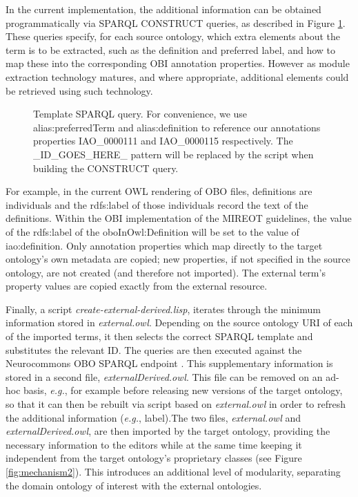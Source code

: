 \documentclass{ao2e}%
\begin{document}
In the current implementation, the additional information can be obtained programmatically via SPARQL \cite{SPARQL} CONSTRUCT queries, as described in Figure \ref{fig:sparql}.
These queries \cite{OBIQueries} specify, for each source ontology, which extra elements about the term is to be extracted, such as the definition and preferred label, and how to map these into the corresponding OBI annotation properties. However as module extraction technology matures, and where appropriate, additional elements could be retrieved using such technology.

\begin{figure}[t]
\scriptsize
 
\caption{Template SPARQL query. For convenience, we use alias:preferredTerm and
alias:definition to reference our annotations properties IAO\_0000111 and IAO\_0000115 \cite{IAO} respectively. The \_ID\_GOES\_HERE\_ pattern will be replaced by the script when building the CONSTRUCT query.}
\label{fig:sparql}
\end{figure}

For example, in the current \ac{OWL} rendering of \ac{OBO} files, definitions are individuals and the rdfs:label of those individuals record the text of the definitions. 
Within the \ac{OBI} implementation of the \ac{MIREOT} guidelines, the value of the rdfs:label of the oboInOwl:Definition will be set to the value of iao:definition. Only annotation properties which map directly to the target ontology's own metadata are copied; new properties, if not specified in the source ontology, are not created (and therefore not imported). The external term's property values are copied exactly from the external resource.

Finally, a script \emph{create-external-derived.lisp}, iterates through the minimum information stored in \emph{external.owl}.
Depending on the source ontology URI of each of the imported terms, it then selects the correct SPARQL template and substitutes the relevant ID.
The queries are then executed against the Neurocommons OBO SPARQL endpoint \cite{NeurocommonsSparql,Neurocommons}. This supplementary information is stored in a second file, \emph{externalDerived.owl}.
This file can be removed on an ad-hoc basis, \emph{e.g.}, for example before releasing new versions of the target ontology, so that it can then be rebuilt via script based on \emph{external.owl} in order to refresh the additional information (\emph{e.g.}, label).The two files, \emph{external.owl} and \emph{externalDerived.owl}, are then imported by the target ontology, providing the necessary information to the editors while at the same time keeping it independent from the target ontology's proprietary classes (see Figure \ref{fig:mechanism2}). This introduces an additional level of modularity, separating the domain ontology of interest with the external ontologies.%
\end{document}
